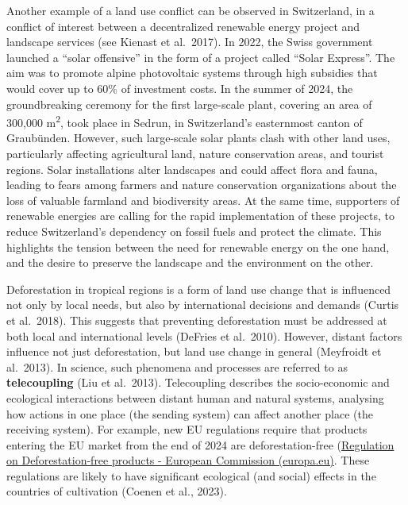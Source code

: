 \documentclass[
  a4paper,
  openany]{book}
\begin{document}
\begin{tcolorbox}[enhanced jigsaw, coltitle=black, bottomtitle=1mm, opacitybacktitle=0.6, titlerule=0mm, opacityback=0, leftrule=.75mm, colbacktitle=quarto-callout-tip-color!10!white, bottomrule=.15mm, toptitle=1mm, breakable, title={Land use conflicts in Switzerland: the Solar Express}, arc=.35mm, rightrule=.15mm, toprule=.15mm, left=2mm, colback=white, colframe=quarto-callout-tip-color-frame]

Another example of a land use conflict can be observed in Switzerland,
in a conflict of interest between a decentralized renewable energy
project and landscape services (see Kienast et al.~2017). In 2022, the
Swiss government launched a ``solar offensive'' in the form of a project
called ``Solar Express''. The aim was to promote alpine photovoltaic
systems through high subsidies that would cover up to 60\% of investment
costs. In the summer of 2024, the groundbreaking ceremony for the first
large-scale plant, covering an area of 300,000 m\textsuperscript{2},
took place in Sedrun, in Switzerland's easternmost canton of Graubünden.
However, such large-scale solar plants clash with other land uses,
particularly affecting agricultural land, nature conservation areas, and
tourist regions. Solar installations alter landscapes and could affect
flora and fauna, leading to fears among farmers and nature conservation
organizations about the loss of valuable farmland and biodiversity
areas. At the same time, supporters of renewable energies are calling
for the rapid implementation of these projects, to reduce Switzerland's
dependency on fossil fuels and protect the climate. This highlights the
tension between the need for renewable energy on the one hand, and the
desire to preserve the landscape and the environment on the other.

\end{tcolorbox}

Deforestation in tropical regions is a form of land use change that is
influenced not only by local needs, but also by international decisions
and demands (Curtis et al.~2018). This suggests that preventing
deforestation must be addressed at both local and international levels
(DeFries et al.~2010). However, distant factors influence not just
deforestation, but land use change in general (Meyfroidt et al.~2013).
In science, such phenomena and processes are referred to as
\textbf{telecoupling} (Liu et al.~2013). Telecoupling describes the
socio-economic and ecological interactions between distant human and
natural systems, analysing how actions in one place (the sending system)
can affect another place (the receiving system). For example, new EU
regulations require that products entering the EU market from the end of
2024 are deforestation-free
(\href{https://environment.ec.europa.eu/topics/forests/deforestation/regulation-deforestation-free-products_en}{Regulation
on Deforestation-free products - European Commission (europa.eu)}. These
regulations are likely to have significant ecological (and social)
effects in the countries of cultivation (Coenen et al., 2023).
\end{document}
